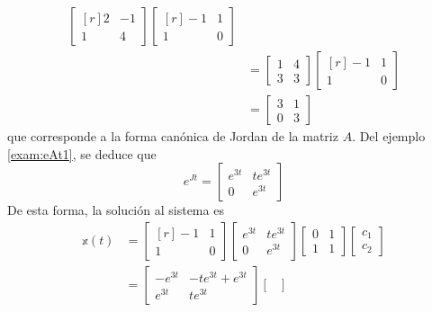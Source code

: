 \begin{example}
\begin{align*}
\begin{bmatrix*}[r]
            2 & -1 \\
            1 & 4
        \end{bmatrix*} \begin{bmatrix*}[r]
            -1 & 1 \\
            1 & 0
        \end{bmatrix*} \\
        & = \begin{bmatrix}
            1 & 4 \\
            3 & 3
        \end{bmatrix} \begin{bmatrix*}[r]
            -1 & 1 \\
            1 & 0
        \end{bmatrix*} \\
        & = \begin{bmatrix}
            3 & 1 \\
            0 & 3
        \end{bmatrix}
    \end{align*}
    que corresponde a la forma canónica de Jordan de la matriz $A$. Del ejemplo \ref{exam:eAt1}, se deduce que
    $$e^{Jt} = \begin{bmatrix}
        e^{3t} & te^{3t} \\
        0 & e^{3t}
    \end{bmatrix}$$
    De esta forma, la solución al sistema es
    \begin{align*}
        \mathbb{x}(t) & = \begin{bmatrix*}[r]
            -1 & 1 \\
            1 & 0
        \end{bmatrix*} \begin{bmatrix}
            e^{3t} & te^{3t} \\
            0 & e^{3t}
        \end{bmatrix} \begin{bmatrix}
            0 & 1 \\
            1 & 1
        \end{bmatrix} \begin{bmatrix}
            c_1 \\
            c_2
        \end{bmatrix} \\
        & = \begin{bmatrix}
            -e^{3t} & -te^{3t} + e^{3t} \\
            e^{3t} & te^{3t}
        \end{bmatrix} \begin{bmatrix}

\end{bmatrix}
\end{align*}
\end{example}
